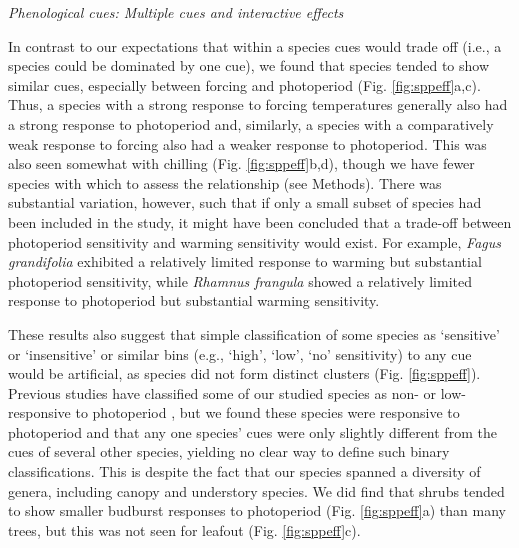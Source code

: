 \documentclass[11pt]{article}
\begin{document}
\noindent \emph{Phenological cues: Multiple cues and interactive effects}

\noindent In contrast to our expectations that within a species cues would trade off (i.e., a species could be dominated by one cue), we found that species tended to show similar cues, especially between forcing and photoperiod (Fig. \ref{fig:sppeff}a,c). Thus, a species with a strong response to forcing temperatures generally also had a strong response to photoperiod and, similarly, a species with a comparatively weak response to forcing also had a weaker response to photoperiod. This was also seen somewhat with chilling (Fig. \ref{fig:sppeff}b,d), though we have fewer species with which to assess the relationship (see Methods). There was substantial variation, however, such that if only a small subset of species had been included in the study, it might have been concluded that a trade-off between photoperiod sensitivity and warming sensitivity would exist. For example, \emph{Fagus grandifolia} exhibited a relatively limited response to warming but substantial photoperiod sensitivity, while \emph{Rhamnus frangula} showed a relatively limited response to photoperiod but substantial warming sensitivity.

These results also suggest that simple classification of some species as `sensitive' or `insensitive' or similar bins (e.g., `high', `low', `no' sensitivity) to any cue would be artificial, as species did not form distinct clusters (Fig. \ref{fig:sppeff}). Previous studies have classified some of our studied species as non- or low-responsive to photoperiod \citep[e.g., \emph{Alnus incana, Aronia melanocarpa} in][]{zohner2016ncc}, but we found these species were responsive to photoperiod and that any one species' cues were only slightly different from the cues of several other species, yielding no clear way to define such binary classifications. This is despite the fact that our species spanned a diversity of genera, including canopy and understory species. We did find that shrubs tended to show smaller budburst responses to photoperiod (Fig. \ref{fig:sppeff}a) than many trees, but this was not seen for leafout (Fig. \ref{fig:sppeff}c). 
\end{document}
